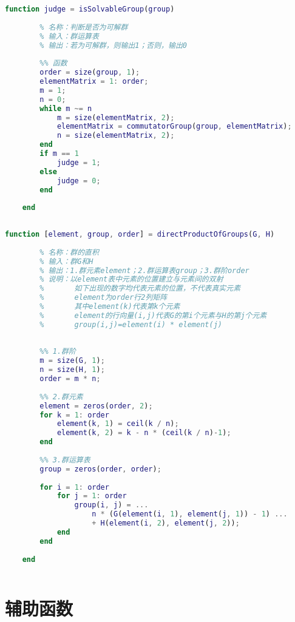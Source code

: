 \begin{lstlisting}[language=Matlab, caption={是否为可解群}, label={isSolvableGroup}]
	function judge = isSolvableGroup(group)
	
	    % 名称：判断是否为可解群
	    % 输入：群运算表
	    % 输出：若为可解群，则输出1；否则，输出0
	    
	    %% 函数
	    order = size(group, 1);
	    elementMatrix = 1: order;
	    m = 1;
	    n = 0;
	    while m ~= n
	        m = size(elementMatrix, 2);
	        elementMatrix = commutatorGroup(group, elementMatrix);
	        n = size(elementMatrix, 2);
	    end
	    if m == 1
	        judge = 1;
	    else
	        judge = 0;
	    end
	
	end
	
\end{lstlisting}

\begin{lstlisting}[language=Matlab, caption={群的直积}, label={directProductOfGroups}]
	function [element, group, order] = directProductOfGroups(G, H)
	
	    % 名称：群的直积
	    % 输入：群G和H
	    % 输出：1.群元素element；2.群运算表group；3.群阶order
	    % 说明：以element表中元素的位置建立与元素间的双射
	    %       如下出现的数字均代表元素的位置，不代表真实元素
	    %       element为order行2列矩阵
	    %       其中element(k)代表第k个元素
	    %       element的行向量(i,j)代表G的第i个元素与H的第j个元素
	    %       group(i,j)=element(i) * element(j)
	
	
	    %% 1.群阶
	    m = size(G, 1);
	    n = size(H, 1);
	    order = m * n;
	
	    %% 2.群元素
	    element = zeros(order, 2);
	    for k = 1: order
	        element(k, 1) = ceil(k / n);
	        element(k, 2) = k - n * (ceil(k / n)-1);
	    end
	
	    %% 3.群运算表
	    group = zeros(order, order);
	
	    for i = 1: order
	        for j = 1: order
	            group(i, j) = ...
	                n * (G(element(i, 1), element(j, 1)) - 1) ...
	                + H(element(i, 2), element(j, 2));
	        end
	    end
	
	end
	
\end{lstlisting}

\section{辅助函数}

